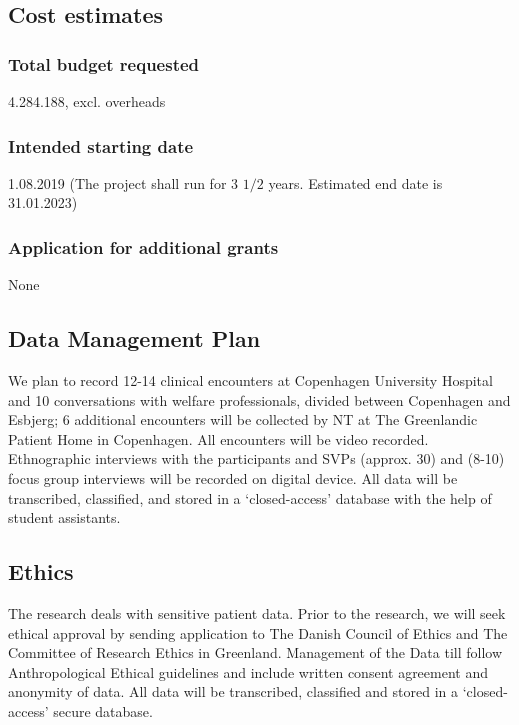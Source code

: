 \documentclass[twocolumn, serif, rga, authordate]{jote-article}
\begin{document}
\subsection*{Cost estimates}



\subsubsection*{Total budget requested}


4.284.188, excl. overheads


\subsubsection*{Intended starting date}


1.08.2019 (The project shall run for 3 $1/2$ years. Estimated end date is 31.01.2023)


\subsubsection*{Application for additional grants}


None


\subsection*{Data Management Plan}


We plan to record 12-14 clinical encounters at Copenhagen University Hospital and 10 conversations with welfare professionals, divided between Copenhagen and Esbjerg; 6 additional encounters will be collected by NT at The Greenlandic Patient Home in Copenhagen. All encounters will be video recorded. Ethnographic interviews with the participants and SVPs (approx. 30) and (8-10) focus group interviews will be recorded on digital device. All data will be transcribed, classified, and stored in a `closed-access' database with the help of student assistants.



\subsection*{Ethics}


The research deals with sensitive patient data. Prior to the research, we will seek ethical approval by sending application to The Danish Council of Ethics and The Committee of Research Ethics in Greenland.
Management of the Data till follow Anthropological Ethical guidelines and include written consent agreement and anonymity of data. All data will be transcribed, classified and stored in a `closed-access' secure database.
\end{document}
